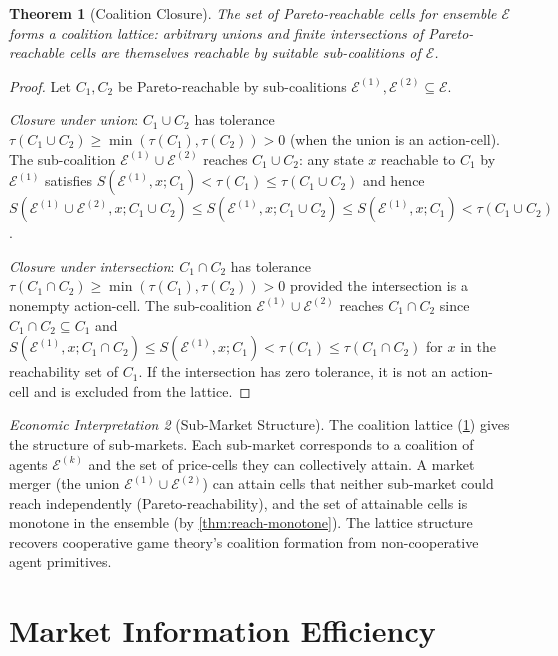 \documentclass[twocolumn,11pt,a4paper]{article}
\newtheorem{theorem}{Theorem}[section]
\theoremstyle{remark}
\newtheorem{econinterp}[theorem]{Economic Interpretation}
\newcommand{\tol}{\tau}
\newcommand{\Ens}{\mathcal{E}}            %
\begin{document}
\begin{theorem}[Coalition Closure]
\label{thm:coalition}
The set of Pareto-reachable cells for ensemble $\Ens$ forms a coalition
lattice: arbitrary unions and finite intersections of Pareto-reachable cells
are themselves reachable by suitable sub-coalitions of $\Ens$.
\end{theorem}
\begin{proof}
Let $C_1, C_2$ be Pareto-reachable by sub-coalitions $\Ens^{(1)},
\Ens^{(2)} \subseteq \Ens$.

\medskip
\noindent\emph{Closure under union}: $C_1 \cup C_2$ has tolerance
$\tol(C_1 \cup C_2) \ge \min(\tol(C_1), \tol(C_2)) > 0$ (when the union
is an action-cell).  The sub-coalition $\Ens^{(1)} \cup \Ens^{(2)}$ reaches
$C_1 \cup C_2$: any state $x$ reachable to $C_1$ by $\Ens^{(1)}$ satisfies
$S(\Ens^{(1)}, x; C_1) < \tol(C_1) \le \tol(C_1 \cup C_2)$ and hence
$S(\Ens^{(1)} \cup \Ens^{(2)}, x; C_1 \cup C_2) \le S(\Ens^{(1)}, x;
C_1 \cup C_2) \le S(\Ens^{(1)}, x; C_1) < \tol(C_1 \cup C_2)$.

\medskip
\noindent\emph{Closure under intersection}: $C_1 \cap C_2$ has tolerance
$\tol(C_1 \cap C_2) \ge \min(\tol(C_1), \tol(C_2)) > 0$ provided the
intersection is a nonempty action-cell.  The sub-coalition $\Ens^{(1)} \cup
\Ens^{(2)}$ reaches $C_1 \cap C_2$ since $C_1 \cap C_2 \subseteq C_1$ and
$S(\Ens^{(1)}, x; C_1 \cap C_2) \le S(\Ens^{(1)}, x; C_1) < \tol(C_1)
\le \tol(C_1 \cap C_2)$ for $x$ in the reachability set of $C_1$.  If the
intersection has zero tolerance, it is not an action-cell and is excluded
from the lattice.
\end{proof}

\begin{econinterp}[Sub-Market Structure]
\label{ei:coalition}
The coalition lattice (\cref{thm:coalition}) gives the structure of
sub-markets.  Each sub-market corresponds to a coalition of agents $\Ens^{(k)}$
and the set of price-cells they can collectively attain.  A market merger
(the union $\Ens^{(1)} \cup \Ens^{(2)}$) can attain cells that neither
sub-market could reach independently (Pareto-reachability), and the set
of attainable cells is monotone in the ensemble (by
\cref{thm:reach-monotone}).  The lattice structure recovers cooperative
game theory's coalition formation from non-cooperative agent primitives.
\end{econinterp}

\section{Market Information Efficiency}
\label{sec:emh}
\end{document}
